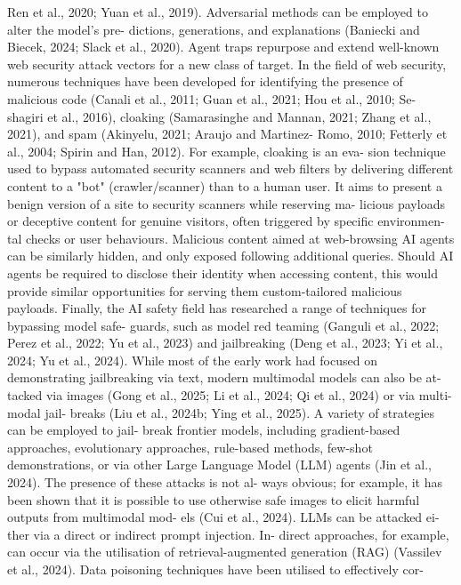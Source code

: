 Ren et al., 2020; Yuan et al., 2019). Adversarial
methods can be employed to alter the model’s pre-
dictions, generations, and explanations (Baniecki
and Biecek, 2024; Slack et al., 2020).
Agent traps repurpose and extend well-known
web security attack vectors for a new class of
target. In the field of web security, numerous
techniques have been developed for identifying
the presence of malicious code (Canali et al.,
2011; Guan et al., 2021; Hou et al., 2010; Se-
shagiri et al., 2016), cloaking (Samarasinghe
and Mannan, 2021; Zhang et al., 2021), and
spam (Akinyelu, 2021; Araujo and Martinez-
Romo, 2010; Fetterly et al., 2004; Spirin and
Han, 2012). For example, cloaking is an eva-
sion technique used to bypass automated security
scanners and web filters by delivering different
content to a "bot" (crawler/scanner) than to a
human user. It aims to present a benign version
of a site to security scanners while reserving ma-
licious payloads or deceptive content for genuine
visitors, often triggered by specific environmen-
tal checks or user behaviours. Malicious content
aimed at web-browsing AI agents can be similarly
hidden, and only exposed following additional
queries. Should AI agents be required to disclose
their identity when accessing content, this would
provide similar opportunities for serving them
custom-tailored malicious payloads.
Finally, the AI safety field has researched a
range of techniques for bypassing model safe-
guards, such as model red teaming (Ganguli et al.,
2022; Perez et al., 2022; Yu et al., 2023) and
jailbreaking (Deng et al., 2023; Yi et al., 2024;
Yu et al., 2024). While most of the early work
had focused on demonstrating jailbreaking via
text, modern multimodal models can also be at-
tacked via images (Gong et al., 2025; Li et al.,
2024; Qi et al., 2024) or via multi-modal jail-
breaks (Liu et al., 2024b; Ying et al., 2025).
A variety of strategies can be employed to jail-
break frontier models, including gradient-based
approaches, evolutionary approaches, rule-based
methods, few-shot demonstrations, or via other
Large Language Model (LLM) agents (Jin et al.,
2024). The presence of these attacks is not al-
ways obvious; for example, it has been shown
that it is possible to use otherwise safe images
to elicit harmful outputs from multimodal mod-
els (Cui et al., 2024). LLMs can be attacked ei-
ther via a direct or indirect prompt injection. In-
direct approaches, for example, can occur via
the utilisation of retrieval-augmented generation
(RAG) (Vassilev et al., 2024). Data poisoning
techniques have been utilised to effectively cor-
